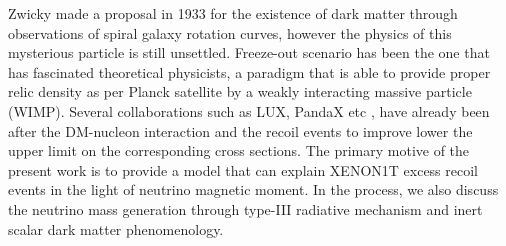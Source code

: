 \documentclass[aps, a4paper,superscriptaddress,12pt,preprintnumbers,floatfix,nofootinbib,amsmath,amssymb]{revtex4}
\begin{document}

Zwicky made a proposal in 1933 for the existence of dark matter through observations of spiral galaxy rotation curves, however the physics of this mysterious particle is still unsettled. Freeze-out scenario has been the one that has fascinated theoretical physicists, a paradigm that is able to provide proper relic density as per Planck satellite by a weakly interacting massive particle (WIMP). Several collaborations such as LUX, PandaX etc \cite{LUX:2016ggv, PandaX-II:2017hlx}, have already been after the DM-nucleon interaction and the recoil events to improve lower the upper limit on the corresponding cross sections. The primary motive of the present work is to provide a model that can explain XENON1T excess recoil events in the light of neutrino magnetic moment. In the process, we also discuss the neutrino mass generation through type-III radiative mechanism and inert scalar dark matter phenomenology. 
\end{document}
